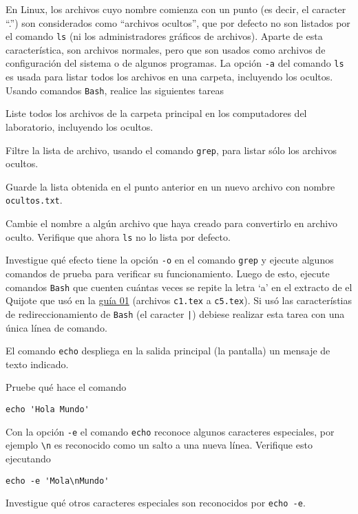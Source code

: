 \documentclass[11pt]{exam}
\begin{document}
\begin{questions}

\item En Linux, los archivos cuyo nombre comienza con un punto (es decir, el caracter ``.'') son considerados como ``archivos ocultos'', que por defecto no son listados por el comando \texttt{ls} (ni los administradores gráficos de archivos). Aparte de esta característica, son archivos normales, pero que son usados como archivos de configuración del sistema o de algunos programas. La opción \texttt{-a} del comando \texttt{ls} es usada para listar todos los archivos en una carpeta, incluyendo los ocultos. Usando comandos \texttt{Bash}, realice las siguientes tareas
\begin{parts}
\item Liste todos los archivos de la carpeta principal en los computadores del laboratorio, incluyendo los ocultos.
\item Filtre la lista de archivo, usando el comando \texttt{grep}, para listar sólo los archivos ocultos.
\item Guarde la lista obtenida en el punto anterior en un nuevo archivo con nombre \texttt{ocultos.txt}.
\item Cambie el nombre a algún archivo que haya creado para convertirlo en archivo oculto. Verifique que ahora \texttt{ls} no lo lista por defecto.
\end{parts}

\item Investigue qué efecto tiene la opción \texttt{-o} en el comando \texttt{grep} y ejecute algunos comandos de prueba para verificar su funcionamiento. Luego de esto, ejecute comandos \texttt{Bash} que cuenten cuántas veces se repite la letra `a' en el extracto de el Quijote que usó en la \href{https://github.com/gfrubi/CC/tree/master/guias/01}{guía 01} (archivos \texttt{c1.tex} a \texttt{c5.tex}). Si usó las característias de redireccionamiento de \texttt{Bash} (el caracter \texttt{|}) debiese realizar esta tarea con una única línea de comando.

\item El comando \texttt{echo} despliega en la salida principal (la pantalla) un mensaje de texto indicado.
\begin{parts}
\item Pruebe qué hace el comando 
\begin{verbatim}
echo 'Hola Mundo'
\end{verbatim}
\item Con la opción \texttt{-e} el comando \texttt{echo} reconoce algunos caracteres especiales, por ejemplo \verb|\n| es reconocido como un salto a una nueva línea. Verifique esto ejecutando
\begin{verbatim}
echo -e 'Mola\nMundo'
\end{verbatim}
\item Investigue qué otros caracteres especiales son reconocidos por \texttt{echo -e}.
\end{parts}


\end{questions}
\end{document}
